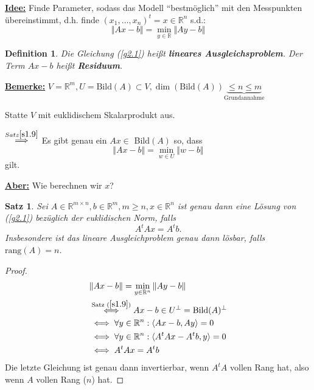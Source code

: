 \documentclass{book}
\newtheorem{theorem}[algorithm]{Satz}
\newtheorem{definition}[algorithm]{Definition}
\def\R{\mathbb{R}}
\def\rang{\text{rang}}
\begin{document}
            \underline{\textbf{Idee:}} Finde Parameter, sodass das Modell ``bestmöglich'' mit den Messpunkten übereinstimmt, 
            d.h. finde $(x_1,\dots,x_n)^t=x\in\R^n$ s.d.:
            \begin{equation}\label{g2.1}
                \Vert Ax-b \Vert=\min_{y\in\R} \Vert Ay-b \Vert
            \end{equation}
            
            \begin{definition}\label{d2.2}
                Die Gleichung (\ref{g2.1}) heißt \textbf{lineares Ausgleichsproblem}. Der Term $Ax-b$ heißt \textbf{Residuum}.
            \end{definition}

            \underline{\textbf{Bemerke:}} $V=\R^m,U=\text{Bild}(A)\subset V,\dim(\text{Bild}(A))\underbrace{\leq n\leq m}_{\text{Grundannahme}}$

            Statte $V$ mit euklidischem Skalarprodukt aus.

            $\stackrel{Satz \ref{s1.9}}{\implies}$ Es gibt genau ein $Ax\in$ Bild$(A)$ so, dass
            \[\Vert Ax-b \Vert=\min_{w\in U} \Vert w-b \Vert\]
            gilt.

            \underline{\textbf{Aber:}} Wie berechnen wir $x$?

            \begin{theorem}\label{s2.3}
                Sei $A\in\R^{m\times n},b\in\R^m,m\geq n,x\in\R^n$ ist genau dann eine Lösung von (\ref{g2.1}) 
                bezüglich der euklidischen Norm, falls
                \begin{equation}\label{g2.2}
                    A^tAx=A^tb.
                \end{equation}
                Insbesondere ist das lineare Ausgleichproblem genau dann lösbar, falls $\rang(A)=n$.
            \end{theorem}

            \begin{proof}
                \begin{align*}
                    &\Vert Ax-b \Vert=\min_{y\in\R^n} \Vert Ay-b \Vert\\
                    &\stackrel{\text{Satz } (\ref{s1.9})}{\iff}Ax-b\in U^\perp=\text{Bild}(A)^\perp\\
                    &\iff \forall y\in\R^n: \langle Ax-b, Ay\rangle=0\\
                    &\iff \forall y\in\R^n: \langle A^tAx-A^tb,y \rangle=0\\
                    &\iff A^tAx=A^tb
                \end{align*}
                Die letzte Gleichung ist genau dann invertierbar, wenn $A^tA$ vollen Rang hat, also wenn $A$ vollen Rang ($n$) hat.
            \end{proof}
\end{document}
